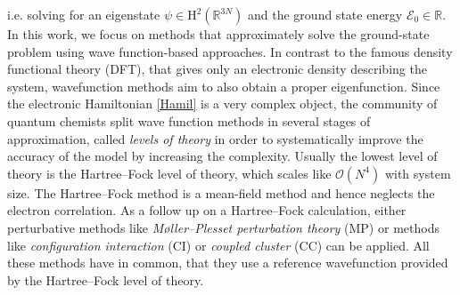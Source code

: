 \documentclass[reqno]{amsart}
\begin{document}
i.e. solving for an eigenstate $\psi \in \mathrm{H}^2(\mathbb{R}^{3N})$ and the ground state energy $\mathcal{E}_0\in \mathbb{R}$. In this work, we focus on methods that approximately solve the ground-state problem using wave function-based approaches. In contrast to the famous density functional theory (DFT), that gives only an electronic density describing the system, wavefunction methods aim to also obtain a proper eigenfunction. Since the electronic Hamiltonian \eqref{Hamil} is a very complex object, the community of quantum chemists split wave function methods in several stages of approximation, called \textit{levels of theory} in order to systematically improve the accuracy of the model by increasing the complexity. Usually the lowest level of theory is the Hartree–Fock level of theory, which scales like $\mathcal{O}(N^4)$ with system size. The Hartree–Fock method is a mean-field method and hence neglects the electron correlation. As a follow up on a Hartree–Fock calculation, either perturbative methods like \textit{Møller–Plesset perturbation theory} (MP) or methods like \textit{configuration interaction} (CI) or \textit{coupled cluster} (CC) can be applied. All these methods have in common, that they use a reference wavefunction provided by the Hartree–Fock level of theory.
\end{document}
